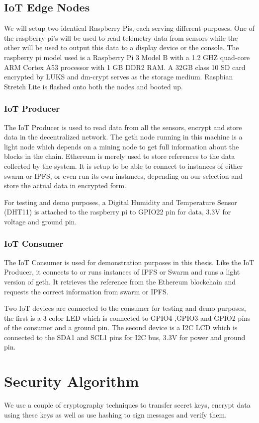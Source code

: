 \documentclass[11pt,openright]{report}
\begin{document}
\subsection{IoT Edge Nodes}
We will setup two identical Raspberry Pis, each serving different purposes. One of the raspberry pi's will be used to read telemetry data from sensors while the other will be used to output this data to a display device or the console.
The raspberry pi model used is a Raspberry Pi 3 Model B with a 1.2 GHZ quad-core ARM Cortex A53 processor with 1 GB DDR2 RAM. A 32GB class 10 SD card encrypted by LUKS and dm-crypt serves as the storage medium. Raspbian Stretch Lite is flashed onto both the nodes and booted up.

\subsubsection{IoT Producer}
The IoT Producer is used to read data from all the sensors, encrypt and store data in the decentralized network. The geth node running in this machine is a light node which depends on a mining node to get full information about the blocks in the chain. Ethereum is merely used to store references to the data collected by the system. It is setup to be able to connect to instances of either swarm or IPFS, or even run its own instances, depending on our selection and store the actual data in encrypted form.

For testing and demo purposes, a Digital Humidity and Temperature Sensor (DHT11) is attached to the raspberry pi to GPIO22 pin for data, 3.3V for voltage and ground pin.

\subsubsection{IoT Consumer}
The IoT Consumer is used for demonstration purposes in this thesis. Like the IoT Producer, it connects to or runs instances of IPFS or Swarm and runs a light version of geth. It retrieves the reference from the Ethereum blockchain and requests the correct information from swarm or IPFS.

Two IoT devices are connected to the consumer for testing and demo purposes, the first is a 3 color LED which is connected to GPIO4 ,GPIO3 and GPIO2 pins of the consumer and a ground pin. The second device is a I2C LCD which is connected to the SDA1 and SCL1 pins for I2C bus, 3.3V for power and ground pin.

\section{Security Algorithm}
We use a couple of cryptography techniques to transfer secret keys, encrypt data using these keys as well as use hashing to sign messages and verify them.
\end{document}
